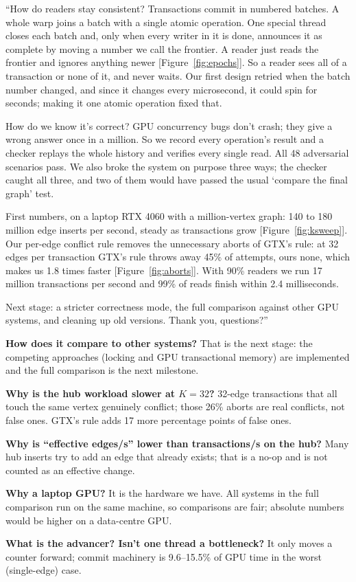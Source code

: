 \documentclass[11pt,a4paper]{article}
\begin{document}
\begin{sayit}
``How do readers stay consistent? Transactions commit in numbered batches. A whole warp joins a batch with a single
atomic operation. One special thread closes each batch and, only when every writer in it is done, announces it as
complete by moving a number we call the frontier. A reader just reads the frontier and ignores anything newer
[Figure~\ref{fig:epochs}]. So a reader sees all of a transaction or none of it, and never waits. Our first design
retried when the batch number changed, and since it changes every microsecond, it could spin for seconds; making it one
atomic operation fixed that.

How do we know it's correct? GPU concurrency bugs don't crash; they give a wrong answer once in a million. So we record
every operation's result and a checker replays the whole history and verifies every single read. All 48 adversarial
scenarios pass. We also broke the system on purpose three ways; the checker caught all three, and two of them would
have passed the usual `compare the final graph' test.

First numbers, on a laptop RTX 4060 with a million-vertex graph: 140 to 180 million edge inserts per second, steady as
transactions grow [Figure~\ref{fig:ksweep}]. Our per-edge conflict rule removes the unnecessary aborts of GTX's rule:
at 32 edges per transaction GTX's rule throws away 45\% of attempts, ours none, which makes us 1.8 times faster
[Figure~\ref{fig:aborts}]. With 90\% readers we run 17 million transactions per second and 99\% of reads finish within
2.4 milliseconds.

Next stage: a stricter correctness mode, the full comparison against other GPU systems, and cleaning up old versions.
Thank you, questions?''
\end{sayit}

\begin{askme}
\textbf{How does it compare to other systems?} That is the next stage: the competing approaches (locking and GPU
transactional memory) are implemented and the full comparison is the next milestone.

\textbf{Why is the hub workload slower at $K=32$?} 32-edge transactions that all touch the same vertex genuinely
conflict; those 26\% aborts are real conflicts, not false ones. GTX's rule adds 17 more percentage points of false ones.

\textbf{Why is ``effective edges/s'' lower than transactions/s on the hub?} Many hub inserts try to add an edge that
already exists; that is a no-op and is not counted as an effective change.

\textbf{Why a laptop GPU?} It is the hardware we have. All systems in the full comparison run on the same machine,
so comparisons are fair; absolute numbers would be higher on a data-centre GPU.

\textbf{What is the advancer? Isn't one thread a bottleneck?} It only moves a counter forward; commit machinery is
9.6--15.5\% of GPU time in the worst (single-edge) case.
\end{askme}
\end{document}
